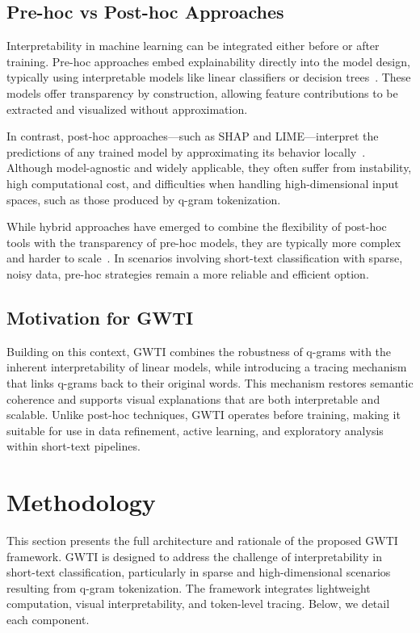 \documentclass[runningheads,10pt]{llncs}
\begin{document}
\subsection{Pre-hoc vs Post-hoc Approaches}

Interpretability in machine learning can be integrated either before or after training. Pre-hoc approaches embed explainability directly into the model design, typically using interpretable models like linear classifiers or decision trees~\cite{gilpin2018explaining}. These models offer transparency by construction, allowing feature contributions to be extracted and visualized without approximation.

In contrast, post-hoc approaches—such as \ac{SHAP} and \ac{LIME}—interpret the predictions of any trained model by approximating its behavior locally~\cite{salih2023commentary}. Although model-agnostic and widely applicable, they often suffer from instability, high computational cost, and difficulties when handling high-dimensional input spaces, such as those produced by q-gram tokenization.

While hybrid approaches have emerged to combine the flexibility of post-hoc tools with the transparency of pre-hoc models, they are typically more complex and harder to scale~\cite{biswas2024hybrid}. In scenarios involving short-text classification with sparse, noisy data, pre-hoc strategies remain a more reliable and efficient option.

\subsection{Motivation for \ac{GWTI}}
Building on this context, \ac{GWTI} combines the robustness of q-grams with the inherent interpretability of linear models, while introducing a tracing mechanism that links q-grams back to their original words. This mechanism restores semantic coherence and supports visual explanations that are both interpretable and scalable. Unlike post-hoc techniques, \ac{GWTI} operates before training, making it suitable for use in data refinement, active learning, and exploratory analysis within short-text pipelines.

\section{Methodology}
\label{sec/methodology}

This section presents the full architecture and rationale of the proposed \ac{GWTI} framework. \ac{GWTI} is designed to address the challenge of interpretability in short-text classification, particularly in sparse and high-dimensional scenarios resulting from q-gram tokenization. The framework integrates lightweight computation, visual interpretability, and token-level tracing. Below, we detail each component.
\end{document}

